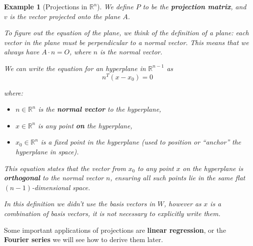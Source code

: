 \documentclass{book}
\newtheorem{example}{Example}[section]
\begin{document}
\begin{example}[Projections in $\mathbb{R}^{n}$]
    We define $P$ to be the \textbf{projection matrix}, and $v$ is the vector
    projected onto the plane $A$.

    To figure out the equation of the plane, we think of the definition of a plane:
    each vector in the plane must be perpendicular to a normal vector. This means
    that we always have $A\cdot n = O$, where $n$ is the normal vector.

    We can write the equation for an hyperplane in $\mathbb{R}^{n-1}$ as
    \begin{equation}
        n^{T}(x-x_0) = 0
    \end{equation}

    where:
    \begin{itemize}
        \item $n \in \mathbb{R}^n$ is the \textbf{normal vector} to the hyperplane,
        \item $x \in \mathbb{R}^n$ is any point \textbf{on} the hyperplane,
        \item $x_0 \in \mathbb{R}^n$ is a fixed point in the hyperplane (used to position or ``anchor'' the hyperplane in space).
    \end{itemize}

    This equation states that the vector from $x_0$ to any point $x$ on the
    hyperplane is \textbf{orthogonal} to the normal vector $n$, ensuring all such
    points lie in the same flat $(n-1)$-dimensional space.

    In this definition we didn't use the basis vectors in $W$, however as $x$ is a
    combination of basis vectors, it is not necessary to explicitly write them.
\end{example}

Some important applications of projections are \textbf{linear regression}, or
the \textbf{Fourier series} we will see how to derive them later.

\end{document}
